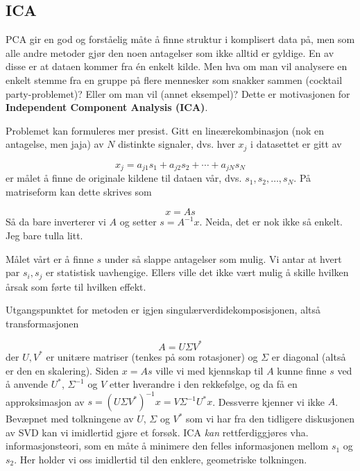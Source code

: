 \subsection{ICA}
PCA gir en god og forståelig måte å finne struktur i komplisert data på, men som alle andre metoder gjør den noen antagelser som ikke alltid er gyldige. En av disse er at dataen kommer fra én enkelt kilde. Men hva om man vil analysere en enkelt stemme fra en gruppe på flere mennesker som snakker sammen (cocktail party-problemet)? Eller om man vil (annet eksempel)? Dette er motivasjonen for \textbf{Independent Component Analysis (ICA)}.

Problemet kan formuleres mer presist. Gitt en lineærekombinasjon (nok en antagelse, men jaja) av $N$ distinkte signaler, dvs. hver $x_j$ i datasettet er gitt av

\begin{equation}
	x_j = a_{j1} s_1 + a_{j2} s_2 + \cdots + a_{jN} s_N
\end{equation}
er målet å finne de originale kildene til dataen vår, dvs. $s_1, s_2, \dots, s_N$. På matriseform kan dette skrives som

\begin{equation}
	x = A s
\end{equation}
Så da bare inverterer vi $A$ og setter $s = A^{-1} x$. Neida, det er nok ikke så enkelt. Jeg bare tulla litt.

Målet vårt er å finne $s$ under så slappe antagelser som mulig. Vi antar at hvert par $s_i, s_j$ er statistisk uavhengige. Ellers ville det ikke vært mulig å skille hvilken årsak som førte til hvilken effekt.

Utgangspunktet for metoden er igjen singulærverdidekomposisjonen, altså transformasjonen

\begin{equation}
	A = U \Sigma V^*
\end{equation}
der $U, V^*$ er unitære matriser (tenkes på som rotasjoner) og $\Sigma$ er diagonal (altså er den en skalering). Siden $x = A s$ ville vi med kjennskap til $A$ kunne finne $s$ ved å anvende $U^*$, $\Sigma^{-1}$ og $V$ etter hverandre i den rekkefølge, og da få en approksimasjon av $s = (U \Sigma V^*)^{-1} x = V \Sigma^{-1} U^* x$. Dessverre kjenner vi ikke $A$. Bevæpnet med tolkningene av $U$, $\Sigma$ og $V^*$ som vi har fra den tidligere diskusjonen av SVD kan vi imidlertid gjøre et forsøk. ICA \textit{kan} rettferdiggjøres vha. informasjonsteori, som en måte å minimere den felles informasjonen mellom $s_1$ og $s_2$. Her holder vi oss imidlertid til den enklere, geometriske tolkningen.

